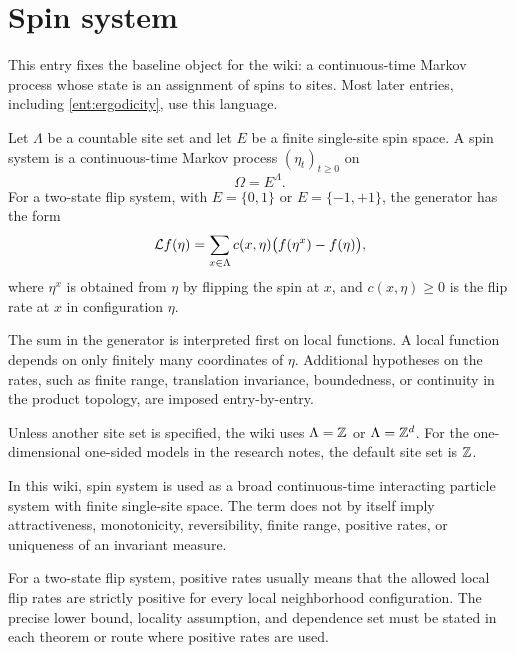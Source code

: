 
\section{Spin system}\label{ent:spin-system}

This entry fixes the baseline object for the wiki: a continuous-time Markov process whose state is an assignment of spins to sites. Most later entries, including \cref{ent:ergodicity}, use this language.


\begin{defn}\label{def:spin-system}
Let \(\Lambda\) be a countable site set and let \(E\) be a finite single-site spin space. A spin system is a continuous-time Markov process \((\eta_t)_{t\ge0}\) on
\[
    \Omega=E^\Lambda.
\]
For a two-state flip system, with \(E=\{0,1\}\) or \(E=\{-1,+1\}\), the generator has the form
\[
    \mathcal{L} f(\eta)
    =\sum_{x\in\Lambda} c(x,\eta)\bigl(f(\eta^x)-f(\eta)\bigr),
\]
where \(\eta^x\) is obtained from \(\eta\) by flipping the spin at \(x\), and \(c(x,\eta)\ge0\) is the flip rate at \(x\) in configuration \(\eta\).
\end{defn}

The sum in the generator is interpreted first on local functions. A local function depends on only finitely many coordinates of \(\eta\). Additional hypotheses on the rates, such as finite range, translation invariance, boundedness, or continuity in the product topology, are imposed entry-by-entry.

\begin{conv}\label{conv:spin-system-lattice}
Unless another site set is specified, the wiki uses \(\Lambda=\mathbb{Z}\) or \(\Lambda=\mathbb{Z}^d\). For the one-dimensional one-sided models in the research notes, the default site set is \(\mathbb{Z}\).
\end{conv}

\begin{rem}[Terminology]\label{rem:spin-system-terminology}
In this wiki, spin system is used as a broad continuous-time interacting particle system with finite single-site space. The term does not by itself imply attractiveness, monotonicity, reversibility, finite range, positive rates, or uniqueness of an invariant measure.
\end{rem}

\begin{rem}\label{rem:spin-system-positive-rates}
For a two-state flip system, positive rates usually means that the allowed local flip rates are strictly positive for every local neighborhood configuration. The precise lower bound, locality assumption, and dependence set must be stated in each theorem or route where positive rates are used.
\end{rem}
